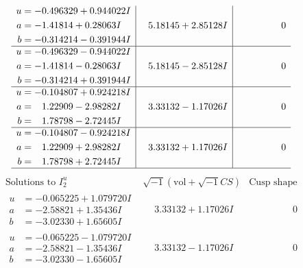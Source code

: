 \documentclass[1p]{elsarticle_modified}
\theoremstyle{definition}
\newcommand{\I}{\sqrt{-1}}
\begin{document}
$$\begin{array}{c|c|c}
\begin{aligned}
u &= -0.496329 + 0.944022 I \\
a &= -1.41814 + 0.28063 I \\
b &= -0.314214 - 0.391944 I\end{aligned}
 & \phantom{-}5.18145 + 2.85128 I & \phantom{-0.000000 } 0 \\ \hline\begin{aligned}
u &= -0.496329 - 0.944022 I \\
a &= -1.41814 - 0.28063 I \\
b &= -0.314214 + 0.391944 I\end{aligned}
 & \phantom{-}5.18145 - 2.85128 I & \phantom{-0.000000 } 0 \\ \hline\begin{aligned}
u &= -0.104807 + 0.924218 I \\
a &= \phantom{-}1.22909 - 2.98282 I \\
b &= \phantom{-}1.78798 - 2.72445 I\end{aligned}
 & \phantom{-}3.33132 - 1.17026 I & \phantom{-0.000000 } 0 \\ \hline\begin{aligned}
u &= -0.104807 - 0.924218 I \\
a &= \phantom{-}1.22909 + 2.98282 I \\
b &= \phantom{-}1.78798 + 2.72445 I\end{aligned}
 & \phantom{-}3.33132 + 1.17026 I & \phantom{-0.000000 } 0\\
 \hline 
 \end{array}$$\newpage$$\begin{array}{c|c|c}  
\text{Solutions to }I^u_{2}& \I (\text{vol} + \sqrt{-1}CS) & \text{Cusp shape}\\
 \hline 
\begin{aligned}
u &= -0.065225 + 1.079720 I \\
a &= -2.58821 + 1.35436 I \\
b &= -3.02330 + 1.65605 I\end{aligned}
 & \phantom{-}3.33132 + 1.17026 I & \phantom{-0.000000 } 0 \\ \hline\begin{aligned}
u &= -0.065225 - 1.079720 I \\
a &= -2.58821 - 1.35436 I \\
b &= -3.02330 - 1.65605 I\end{aligned}
 & \phantom{-}3.33132 - 1.17026 I & \phantom{-0.000000 } 0 \\ \hline\begin{aligned}

\end{aligned}
\end{array}$$
\end{document}
